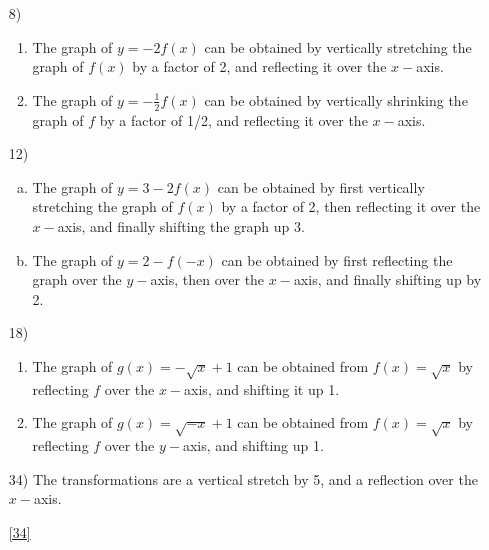 \documentclass[fleqn]{article}
\begin{document}
\begin{enumerate}
\item[8)]
\begin{enumerate}
\item
The graph of $y = -2f(x)$ can be obtained by vertically stretching the graph of $f(x)$ by a factor of 2, and reflecting it over the $x-$axis.

\item
The graph of $y = -\frac{1}{2}f(x)$ can be obtained by vertically shrinking the graph of $f$ by a factor of 1/2, and reflecting it over the $x-$axis.

\end{enumerate}

\item[12)]
\begin{enumerate}[(a)]
\item
The graph of $y = 3 - 2f(x)$ can be obtained by first vertically stretching the graph of $f(x)$ by a factor of 2, then reflecting it over the $x-$axis, and finally shifting the graph up 3.

\item
The graph of $y = 2 - f(-x)$ can be obtained by first reflecting the graph over the $y-$axis, then over the $x-$axis, and finally shifting up by 2.

\end{enumerate}

\item[18)]
\begin{enumerate}
\item
The graph of $g(x) = -\sqrt{x} + 1$ can be obtained from $f(x) = \sqrt{x}$ by reflecting $f$ over the $x-$axis, and shifting it up 1.

\item
The graph of $g(x) = \sqrt{-x} + 1$ can be obtained from $f(x) = \sqrt{x}$ by reflecting $f$ over the $y-$axis, and shifting up 1.

\end{enumerate}

\item[34)]
The transformations are a vertical stretch by 5, and a reflection over the $x-$axis.\\
\ref{34}


\end{enumerate}
\end{document}
